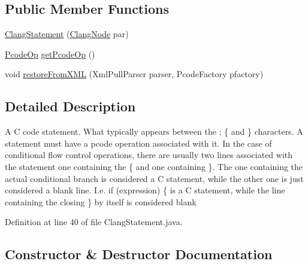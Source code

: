 \subsection*{Public Member Functions}
\begin{DoxyCompactItemize}
\item 
\mbox{\hyperlink{classghidra_1_1app_1_1decompiler_1_1_clang_statement_a77b9609fb93f8dbf907f8cfd99d57177}{Clang\+Statement}} (\mbox{\hyperlink{interfaceghidra_1_1app_1_1decompiler_1_1_clang_node}{Clang\+Node}} par)
\item 
\mbox{\hyperlink{class_pcode_op}{Pcode\+Op}} \mbox{\hyperlink{classghidra_1_1app_1_1decompiler_1_1_clang_statement_a2b7c3031338fa026930e7211623deb5e}{get\+Pcode\+Op}} ()
\item 
void \mbox{\hyperlink{classghidra_1_1app_1_1decompiler_1_1_clang_statement_ad042eadde979f215fd60a9e3aae17cc3}{restore\+From\+X\+ML}} (Xml\+Pull\+Parser parser, Pcode\+Factory pfactory)
\end{DoxyCompactItemize}


\subsection{Detailed Description}
A C code statement. What typically appears between the \textquotesingle{};\textquotesingle{} \textquotesingle{}\{\textquotesingle{} and \textquotesingle{}\}\textquotesingle{} characters. A statement must have a pcode operation associated with it. In the case of conditional flow control operations, there are usually two lines associated with the statement one containing the \textquotesingle{}\{\textquotesingle{} and one containing \textquotesingle{}\}\textquotesingle{}. The one containing the actual conditional branch is considered a C statement, while the other one is just considered a blank line. I.\+e. if (expression) \{ is a C statement, while the line containing the closing \textquotesingle{}\}\textquotesingle{} by itself is considered blank 

Definition at line 40 of file Clang\+Statement.\+java.



\subsection{Constructor \& Destructor Documentation}
\mbox{\label{classghidra_1_1app_1_1decompiler_1_1_clang_statement_a77b9609fb93f8dbf907f8cfd99d57177}} 
